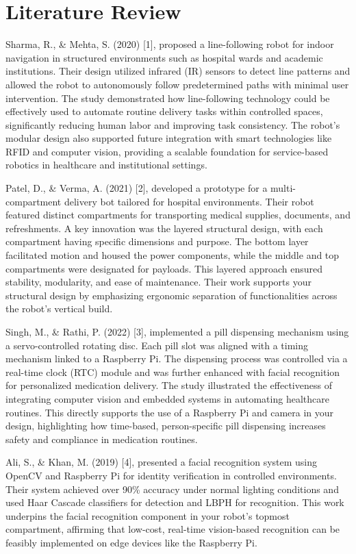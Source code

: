 \section{Literature Review}

Sharma, R., \& Mehta, S. (2020) [1], proposed a line-following robot for indoor navigation in structured environments such as hospital wards and academic institutions. Their design utilized infrared (IR) sensors to detect line patterns and allowed the robot to autonomously follow predetermined paths with minimal user intervention. The study demonstrated how line-following technology could be effectively used to automate routine delivery tasks within controlled spaces, significantly reducing human labor and improving task consistency. The robot’s modular design also supported future integration with smart technologies like RFID and computer vision, providing a scalable foundation for service-based robotics in healthcare and institutional settings.

Patel, D., \& Verma, A. (2021) [2], developed a prototype for a multi-compartment delivery bot tailored for hospital environments. Their robot featured distinct compartments for transporting medical supplies, documents, and refreshments. A key innovation was the layered structural design, with each compartment having specific dimensions and purpose. The bottom layer facilitated motion and housed the power components, while the middle and top compartments were designated for payloads. This layered approach ensured stability, modularity, and ease of maintenance. Their work supports your structural design by emphasizing ergonomic separation of functionalities across the robot's vertical build.

Singh, M., \& Rathi, P. (2022) [3], implemented a pill dispensing mechanism using a servo-controlled rotating disc. Each pill slot was aligned with a timing mechanism linked to a Raspberry Pi. The dispensing process was controlled via a real-time clock (RTC) module and was further enhanced with facial recognition for personalized medication delivery. The study illustrated the effectiveness of integrating computer vision and embedded systems in automating healthcare routines. This directly supports the use of a Raspberry Pi and camera in your design, highlighting how time-based, person-specific pill dispensing increases safety and compliance in medication routines.

Ali, S., \& Khan, M. (2019) [4], presented a facial recognition system using OpenCV and Raspberry Pi for identity verification in controlled environments. Their system achieved over 90\% accuracy under normal lighting conditions and used Haar Cascade classifiers for detection and LBPH for recognition. This work underpins the facial recognition component in your robot’s topmost compartment, affirming that low-cost, real-time vision-based recognition can be feasibly implemented on edge devices like the Raspberry Pi.

